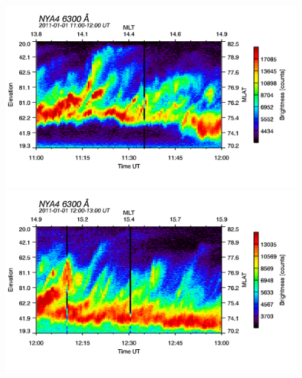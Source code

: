 \begin{figure}
\begin{minipage}{0.24\textwidth}
\includegraphics[width=\textwidth]{Figures/Allsky/6300/nya4_20110101_1100_1200_6300_cal.png}
\end{minipage}
\begin{minipage}{0.24\textwidth}
\includegraphics[width=\textwidth]{Figures/Allsky/6300/nya4_20110101_1200_1300_6300_cal.png}
\end{minipage}


\end{figure}

